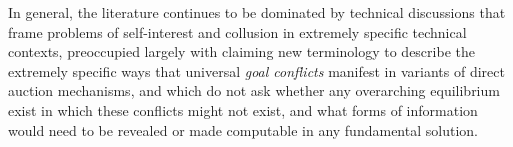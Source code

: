 In general, the literature continues to be dominated by technical discussions that frame problems of self-interest and collusion in extremely specific technical contexts, preoccupied largely with claiming new terminology to describe the extremely specific ways that universal \textit{goal conflicts} manifest in variants of direct auction mechanisms, and which do not ask whether any overarching equilibrium exist in which these conflicts might not exist, and what forms of information would need to be revealed or made computable in any fundamental solution.

